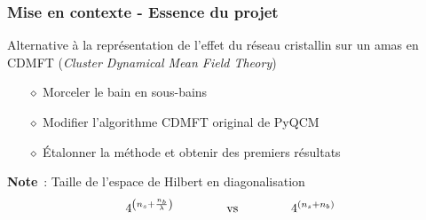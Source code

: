 
\begin{frame}
    \frametitle{Mise en contexte - Essence du projet}
    Alternative à la représentation de l'effet du réseau
    cristallin sur un amas en CDMFT (\textit{Cluster Dynamical Mean Field Theory})
    \vspace{0.3cm}
    \begin{itemize}
        \pause
        \item[$\diamond$] Morceler le bain en sous-bains
        \item[$\diamond$] Modifier l'algorithme CDMFT original de PyQCM\footnotemark
        \item[$\diamond$] Étalonner la méthode et obtenir des premiers résultats
    \end{itemize}
    \vfill
    \pause
    \begin{mybrownbox}{\textbf{Note}~: Taille de l'espace de Hilbert en diagonalisation}
        \begin{align*}
            4^{\qty(n_s + \frac{n_b}{\lambda})}\hspace{1.5cm}\text{vs}\hspace{1.5cm}
          4^{(n_s + n_b)}
        \end{align*}
    \end{mybrownbox}
\end{frame}

